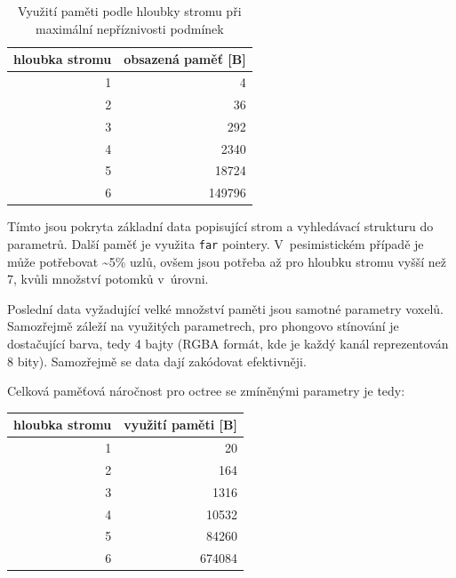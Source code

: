 \begin{table}[H]
	\centering
	\begin{tabular}{|r|r|}
		\hline
		\multicolumn{1}{|c|}{hloubka stromu} & \multicolumn{1}{c|}{obsazená paměť {[}B{]}} \\ \hline
		1                                    & 4                                           \\ \hline
		2                                    & 36                                          \\ \hline
		3                                    & 292                                         \\ \hline
		4                                    & 2340                                        \\ \hline
		5                                    & 18724                                       \\ \hline
		6                                    & 149796                                      \\ \hline
	\end{tabular}
	\caption{Využití paměti podle hloubky stromu při maximální nepříznivosti podmínek}
\end{table}

Tímto jsou pokryta základní data popisující strom a vyhledávací strukturu do parametrů. Další paměť je využita \texttt{far} pointery. V~pesimistickém případě je může potřebovat \textasciitilde5\% uzlů, ovšem jsou potřeba až pro hloubku stromu vyšší než 7, kvůli množství potomků v~úrovni.

Poslední data vyžadující velké množství paměti jsou samotné parametry voxelů. Samozřejmě záleží na využitých parametrech, pro phongovo stínování je dostačující barva, tedy 4 bajty (RGBA formát, kde je každý kanál reprezentován 8 bity). Samozřejmě se data dají zakódovat efektivněji.

Celková paměťová náročnost pro octree se zmíněnými parametry je tedy:

\begin{table}[H]
	\centering
	\begin{tabular}{|r|r|}
		\hline
		\multicolumn{1}{|c|}{hloubka stromu} & \multicolumn{1}{c|}{využití paměti {[}B{]}} \\ \hline
		1                                    & 20                                          \\ \hline
		2                                    & 164                                         \\ \hline
		3                                    & 1316                                        \\ \hline
		4                                    & 10532                                       \\ \hline
		5                                    & 84260                                       \\ \hline
		6                                    & 674084                                      \\ \hline
	\end{tabular}
\end{table}

